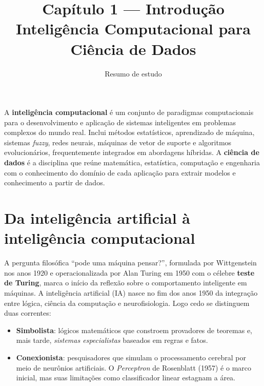 

\title{\sffamily\bfseries Capítulo 1 — Introdução\\
       \large Inteligência Computacional para Ciência de Dados}
\author{Resumo de estudo}
\date{}


\maketitle
\thispagestyle{fancy}

\begin{conceito}
A \textbf{inteligência computacional} é um conjunto de paradigmas
computacionais para o desenvolvimento e aplicação de sistemas inteligentes
em problemas complexos do mundo real. Inclui métodos estatísticos,
aprendizado de máquina, sistemas \emph{fuzzy}, redes neurais, máquinas de
vetor de suporte e algoritmos evolucionários, frequentemente integrados em
abordagens híbridas. A \textbf{ciência de dados} é a disciplina que reúne
matemática, estatística, computação e engenharia com o conhecimento do
domínio de cada aplicação para extrair modelos e conhecimento a partir de
dados.
\end{conceito}

\section{Da inteligência artificial à inteligência computacional}

A pergunta filosófica ``pode uma máquina pensar?'', formulada por
Wittgenstein nos anos 1920 e operacionalizada por Alan Turing em 1950 com
o célebre \textbf{teste de Turing}, marca o início da reflexão sobre o
comportamento inteligente em máquinas. A inteligência artificial (IA)
nasce no fim dos anos 1950 da integração entre lógica, ciência da
computação e neurofisiologia. Logo cedo se distinguem duas correntes:

\begin{itemize}[leftmargin=1.2cm]
  \item \textbf{Simbolista}: lógicos matemáticos que constroem provadores
        de teoremas e, mais tarde, \emph{sistemas especialistas} baseados
        em regras e fatos.
  \item \textbf{Conexionista}: pesquisadores que simulam o processamento
        cerebral por meio de neurônios artificiais. O \emph{Perceptron} de
        Rosenblatt (1957) é o marco inicial, mas suas limitações como
        classificador linear estagnam a área.
\end{itemize}

